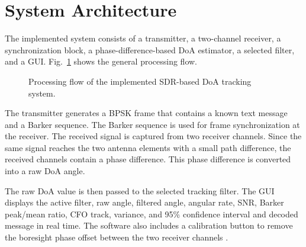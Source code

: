 \documentclass[conference]{IEEEtran}
\begin{document}
\section{System Architecture}

The implemented system consists of a transmitter, a two-channel receiver, a synchronization block, a phase-difference-based DoA estimator, a selected filter, and a GUI. Fig.~\ref{fig:block_diagram} shows the general processing flow.

\begin{figure}[htbp]
\centering
{}
\caption{Processing flow of the implemented SDR-based DoA tracking system.}
\label{fig:block_diagram}
\end{figure}

The transmitter generates a BPSK frame that contains a known text message and a Barker sequence. The Barker sequence is used for frame synchronization at the receiver. The received signal is captured from two receiver channels. Since the same signal reaches the two antenna elements with a small path difference, the received channels contain a phase difference. This phase difference is converted into a raw DoA angle.

The raw DoA value is then passed to the selected tracking filter. The GUI displays the active filter, raw angle, filtered angle, angular rate, SNR, Barker peak/mean ratio, CFO track, variance, and 95\% confidence interval and decoded message in real time. The software also includes a calibration button to remove the boresight phase offset between the two receiver channels \cite{Hou2023BayesianDoA}.
\end{document}
